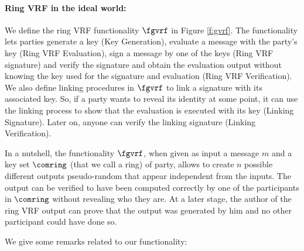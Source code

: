 \paragraph{Ring VRF in the ideal world:} 
We define the ring VRF functionality $ \fgvrf $ in Figure \ref{f:gvrf}. The functionality lets parties generate a key (Key Generation), evaluate a message with the party's key (Ring VRF Evaluation), sign a message by one of the keys (Ring VRF signature) and verify the signature and obtain the evaluation output without knowing the key used for the signature and evaluation (Ring VRF Verification). We also define linking procedures in $ \fgvrf $ to link a signature with its associated key. So, if a party wants to reveal its identity at some point, it can use the linking process to show that the evaluation is executed with its key (Linking Signature). Later on, anyone can verify the linking signature (Linking Verification).

In a nutshell, the functionality $\fgvrf$, when given as input a message $m$ and a key set $\comring$ (that we call a ring) of party, allows to create $n$ possible different outputs pseudo-random that appear independent from the inputs. The output can be verified to have been computed correctly by one of the participants in $\comring$ without revealing who they are. At a later stage, the author of the ring VRF output can prove that the output was generated by him and no other participant could have done so.

We give some remarks related to our functionality:

